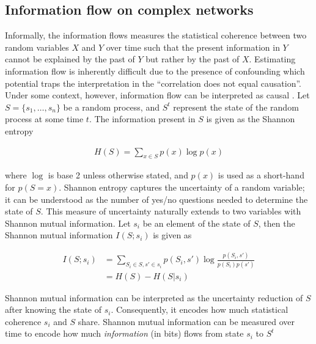 \documentclass[a4paper, 11pt, twocolumn]{article}
\begin{document}
\subsection{Information flow on complex networks}
\label{sec:org3d3e541}
Informally, the information flows measures the statistical coherence
between two random variables \(X\) and \(Y\) over time such that the
present information in \(Y\) cannot be explained by the past of \(Y\)
but rather by the past of \(X\). Estimating information flow is
inherently difficult due to the presence of confounding which potential
traps the interpretation in the ``correlation does not equal causation''.
Under some context, however, information flow can be interpreted as
causal \cite{vanElteren2022}. Let \(S=\{s_1, \dots, s_n\}\) be a random
process, and \(S^t\) represent the state of the random process at some
time \(t\). The information present in \(S\) is given as the Shannon
entropy

\begin{equation}
\label{eq:entropy}
\begin{split}
H(S) = \sum_{x \in S} p(x) \log p(x)
\end{split}
\end{equation}


where \(\log\) is base 2 unless otherwise stated, and \(p(x)\) is used
as a short-hand for \(p(S  = x)\). Shannon entropy captures the
uncertainty of a random variable; it can be understood as the number of
yes/no questions needed to determine the state of \(S\). This measure of
uncertainty naturally extends to two variables with Shannon mutual
information. Let \(s_i\) be an element of the state of \(S\), then the
Shannon mutual information \(I(S; s_i)\) is given as

\begin{equation}
\label{eq:mi}
\begin{split}
I(S; s_i) &= \sum_{S_i\in S, s' \in s_i} p(S_i,s') \log \frac{p(S_i,s')}{p(S_i)p(s')}\\
          &= H(S) - H(S | s_i)
\end{split}
\end{equation}


Shannon mutual information can be interpreted as the uncertainty
reduction of \(S\) after knowing the state of \(s_i\). Consequently, it
encodes how much statistical coherence \(s_i\) and \(S\) share. Shannon
mutual information can be measured over time to encode how much
\emph{information} (in bits) flows from state \(s_i\) to \(S^{t}\)
\end{document}
